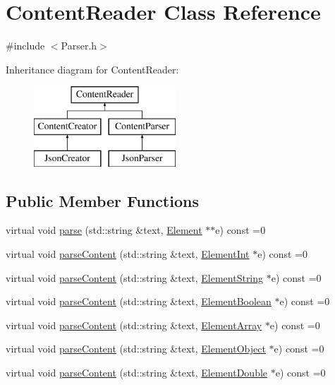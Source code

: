 \hypertarget{classContentReader}{}\section{Content\+Reader Class Reference}
\label{classContentReader}


{\ttfamily \#include $<$Parser.\+h$>$}

Inheritance diagram for Content\+Reader\+:\begin{figure}[H]
\begin{center}
\leavevmode
\includegraphics[height=3.000000cm]{classContentReader}
\end{center}
\end{figure}
\subsection*{Public Member Functions}
\begin{DoxyCompactItemize}
\item 
virtual void \mbox{\hyperlink{classContentReader_a7fff2e63a2e8fa216665604f69974e1d}{parse}} (std\+::string \&text, \mbox{\hyperlink{classElement}{Element}} $\ast$$\ast$e) const =0
\item 
virtual void \mbox{\hyperlink{classContentReader_a7eef37b8b9761e21c0a3907ff94c72f7}{parse\+Content}} (std\+::string \&text, \mbox{\hyperlink{classElementInt}{Element\+Int}} $\ast$e) const =0
\item 
virtual void \mbox{\hyperlink{classContentReader_a310678ddc37a05aca2f13db73b22abe5}{parse\+Content}} (std\+::string \&text, \mbox{\hyperlink{classElementString}{Element\+String}} $\ast$e) const =0
\item 
virtual void \mbox{\hyperlink{classContentReader_a3ee0aec579c723f17742e10fe7c75e39}{parse\+Content}} (std\+::string \&text, \mbox{\hyperlink{classElementBoolean}{Element\+Boolean}} $\ast$e) const =0
\item 
virtual void \mbox{\hyperlink{classContentReader_a91fdd738983dcc7a246c3c163007dfa9}{parse\+Content}} (std\+::string \&text, \mbox{\hyperlink{classElementArray}{Element\+Array}} $\ast$e) const =0
\item 
virtual void \mbox{\hyperlink{classContentReader_a59a8de2bf3436e46b4d029a9b3c3c9da}{parse\+Content}} (std\+::string \&text, \mbox{\hyperlink{classElementObject}{Element\+Object}} $\ast$e) const =0
\item 
virtual void \mbox{\hyperlink{classContentReader_ab4ba739ee5241848ae8af86e64e43a40}{parse\+Content}} (std\+::string \&text, \mbox{\hyperlink{classElementDouble}{Element\+Double}} $\ast$e) const =0
\end{DoxyCompactItemize}


